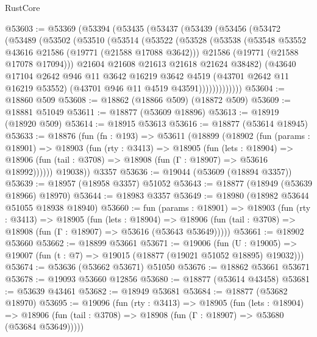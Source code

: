 \begin{lexlean}{RustCore}
\begin{coremodule}
@53603 := @53369
    (@53394
      (@53435
        (@53437
          (@53439
            (@53456
              (@53472
                (@53489
                  (@53502
                    (@53510
                      (@53514
                        (@53522
                          (@53528
                            (@53538
                              (@53548 @53552 @43616 @21586 (@19771 (@21588 @17088 @3642)))
                              @21586
                              (@19771 (@21588 @17078 @17094)))
                            @21604
                            @21608
                            @21613
                            @21618
                            @21624
                            @38482)
                          (@43640
                            @17104
                            @2642
                            @946
                            @11
                            @3642
                            @16219
                            @3642
                            @4519
                            (@43701 @2642 @11 @16219 @53552)
                            (@43701 @946 @11 @4519 @43591)))))))))))))
@53604 := @18860 @509
@53608 := @18862 (@18866 @509) (@18872 @509)
@53609 := @18881 @51049
@53611 := @18877 (@53609 @18896)
@53613 := @18919 (@18920 @509)
@53614 := @18915 @53613
@53616 := @18877 (@53614 @18945)
@53633 := @18876
    (fun (fn : @193) =>
    @53611
      (@18899
        (@18902
          (fun (params : @18901) =>
          @18903
            (fun (rty : @3413) =>
            @18905
              (fun (lets : @18904) =>
              @18906 (fun (tail : @3708) => @18908 (fun (Γ : @18907) => @53616 @18992))))))
        @19038))
    @3357
@53636 := @19044 (@53609 (@18894 @3357))
@53639 := @18957 (@18958 @3357) @51052
@53643 := @18877 (@18949 (@53639 @18966) @18970)
@53644 := @18983 @3357
@53649 := @18980 (@18982 @53644 @51055 @18938 @18940)
@53660 := fun (params : @18901) =>
  @18903
    (fun (rty : @3413) =>
    @18905
      (fun (lets : @18904) =>
      @18906 (fun (tail : @3708) => @18908 (fun (Γ : @18907) => @53616 (@53643 @53649)))))
@53661 := @18902 @53660
@53662 := @18899 @53661
@53671 := @19006
    (fun (U : @19005) => @19007 (fun (t : @7) => @19015 (@18877 (@19021 @51052 @18895) @19032)))
@53674 := @53636 (@53662 @53671) @51050
@53676 := @18862 @53661 @53671
@53678 := @19093 @53660 @12856
@53680 := @18877 (@53614 @43458)
@53681 := @53639 @43461
@53682 := @18949 @53681
@53684 := @18877 (@53682 @18970)
@53695 := @19096
    (fun (rty : @3413) =>
    @18905
      (fun (lets : @18904) =>
      @18906 (fun (tail : @3708) => @18908 (fun (Γ : @18907) => @53680 (@53684 @53649)))))

\end{coremodule}
\end{lexlean}

